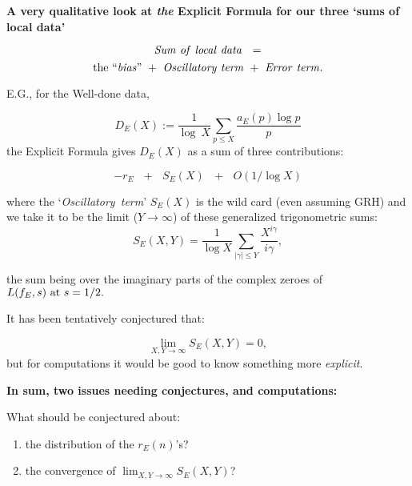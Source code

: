 \documentclass[12pt]{beamer}
\theoremstyle{definition}
\begin{document}
   
 \begin{frame}\vskip20pt
{\Large  \vskip20pt {\bf A very qualitative look at {\it the} Explicit Formula for our three `sums of local data'}
 
 
  $${\rm{\it Sum\ of\ local\ data\  }}  \ = $$
   \vskip20pt 
  $$  {\rm the\ {\it ``bias"}}\ + \  {\rm{\it  Oscillatory\ term}}\ + \  {\rm{\it  Error\ term}}.$$ }\end{frame}
   
 \begin{frame}\vskip20pt
{\Large  \vskip20pt   E.G., for the Well-done data,

$${D}_E(X):= {\frac{1}{\log\ X}}\sum_{p \le X}{\frac{a_E(p)\log p}{ p}}$$
the Explicit Formula gives ${D}_E(X)$ as  a sum of three contributions:

$$-r_E\ \ \  +\ \ \  S_E(X)\ \ \  +\ \ \  O(1/\log X)$$}\end{frame}


 \begin{frame}\vskip20pt
{\Large  \vskip20pt 
where the `{\rm{\it  Oscillatory\ term}}'  $S_E(X) $ is the wild card (even assuming GRH) and we take it to be the limit  ($Y \to {\infty}$) of these generalized trigonometric sums:  \vskip20pt 
 $$S_E(X,Y) = {\frac{1}{\log X}}\sum_{|\gamma| \le Y}{\frac{X^{i\gamma}}{i\gamma}},$$
}\end{frame}


 \begin{frame}\vskip20pt
{\Large  \vskip20pt  the sum being over the imaginary parts of the complex zeroes of  $L(f_E, s)\ {\rm at}\ s=1/2.$}\end{frame}

 \begin{frame}\vskip20pt
{\Large  \vskip20pt  
 It has been tentatively conjectured   that:
  
  $$\lim_{X,Y \to \infty}S_E(X,Y) = 0,$$  but for computations it would be good to know something more {\it explicit}.}\end{frame}

 \begin{frame}\vskip20pt
{\Large  \vskip20pt   
{\bf In sum, two issues needing conjectures, and computations:}
 \vskip20pt 
 
 What should be conjectured about:
 
 \begin{enumerate}\item  the distribution of the $r_E(n)$'s?

 \vskip20pt \item the convergence of $\lim_{X,Y \to \infty}S_E(X,Y)$?\end{enumerate}}\end{frame}

  
\end{document}
